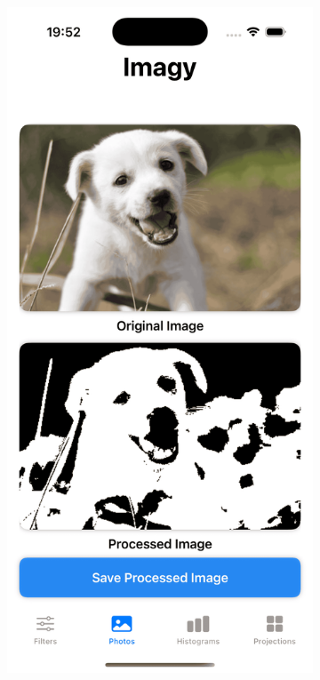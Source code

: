 \documentclass[a4paper]{article}
\begin{document}
\begin{figure}[H]
    \centering
    \begin{subfigure}{0.2\textwidth}
        \centering
        \includegraphics[width=\linewidth]{images/dog_binary_128.png}

\end{subfigure}
\end{figure}
\end{document}
